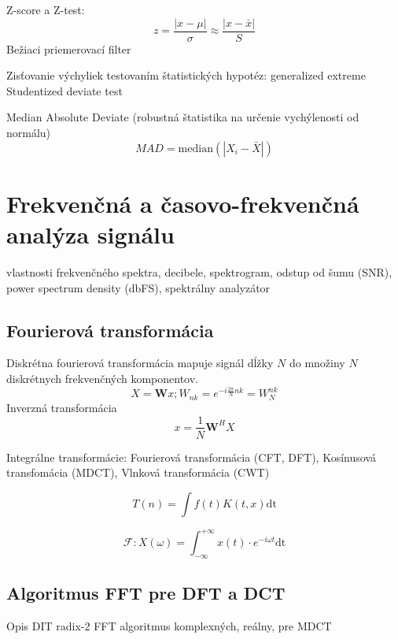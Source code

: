 Z-score a Z-test: 
\begin{equation}
z = \frac{|x - \mu|}{\sigma} \approx \frac{|x - \bar{x}|}{S}
\end{equation}
Bežiaci priemerovací filter \cite{anomaly-detection-models}

Zisťovanie výchyliek testovaním štatistických hypotéz: 
generalized extreme Studentized deviate test \cite{generalized-esd} 

Median Absolute Deviate (robustná štatistika na určenie vychýlenosti od normálu)
\begin{equation}
MAD = \mathrm{median}(|X_i - \bar{X}|)
\end{equation}


\section{Frekvenčná a časovo-frekvenčná analýza signálu}
vlastnosti frekvenčného spektra, decibele, spektrogram, odstup od šumu (SNR), power spectrum density (dbFS), spektrálny analyzátor 

\subsection{Fourierová transformácia}
Diskrétna fourierová transformácia mapuje signál dĺžky $N$ do množiny $N$ diskrétnych frekvenčných komponentov. \cite{signal-processing}
\begin{equation}
X = \mathbf{W}x; W_{nk} = e^{-i\frac{2\pi}{N}nk} = W_N^{nk}
\end{equation}
Inverzná transformácia
\begin{equation}
x = \frac{1}{N}\mathbf{W}^H X
\end{equation}

Integrálne transformácie: Fourierová transformácia (CFT, DFT), Kosínusová transfomácia (MDCT), Vlnková transformácia (CWT) \cite{dct} \cite{casove-frekvencia-analyza-signalu}

\begin{equation}
T(n) = \int{f(t) K(t,x) \mathrm{dt}}
\end{equation}

\begin{equation}
\mathcal{F}: X(\omega) = \int_{-\infty}^{+\infty}{x(t) \cdot e^{-i\omega t} \mathrm{dt}}
\end{equation}

\subsection{Algoritmus FFT pre DFT a DCT}
Opis DIT radix-2 FFT algoritmus komplexných, reálny, pre MDCT \cite{fft-blackbox}

